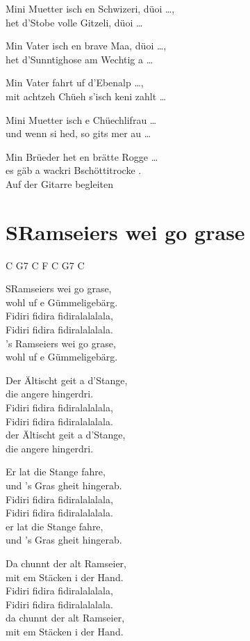 \documentclass[
  letterpaper,
  twoside=false]{scrbook}
\begin{document}
Mini Muetter isch en Schwizeri, düoi \ldots,\\
het d'Stobe volle Gitzeli, düoi \ldots{}

Min Vater isch en brave Maa, düoi \ldots,\\
het d'Sunntighose am Wechtig a \ldots{}

Min Vater fahrt uf d'Ebenalp \ldots,\\
mit achtzeh Chüeh s'isch keni zahlt \ldots{}

Mini Muetter isch e Chüechlifrau \ldots{}\\
und wenn si hed, so git\textquotesingle s mer au \ldots{}

Min Brüeder het en brätte Rogge \ldots{}\\
es gäb a wackri Bschöttitrocke .\\
Auf der Gitarre begleiten

\hypertarget{sramseiers-wei-go-grase}{%
\chapter{S\textquotesingle Ramseiers wei go
grase}\label{sramseiers-wei-go-grase}}

C G7 C F C G7 C

S\textquotesingle Ramseiers wei go grase,\\
wohl uf e Gümmeligebärg.\\
Fidiri fidira fidiralalalala,\\
Fidiri fidira fidiralalalala.\\
's Ramseiers wei go grase,\\
wohl uf e Gümmeligebärg.

Der Ältischt geit a d'Stange,\\
die angere hingerdri.\\
Fidiri fidira fidiralalalala,\\
Fidiri fidira fidiralalalala.\\
der Ältischt geit a d'Stange,\\
die angere hingerdri.

Er lat die Stange fahre,\\
und 's Gras gheit hingerab.\\
Fidiri fidira fidiralalalala,\\
Fidiri fidira fidiralalalala.\\
er lat die Stange fahre,\\
und 's Gras gheit hingerab.

Da chunnt der alt Ramseier,\\
mit em Stäcken i der Hand.\\
Fidiri fidira fidiralalalala,\\
Fidiri fidira fidiralalalala.\\
da chunnt der alt Ramseier,\\
mit em Stäcken i der Hand.
\end{document}
